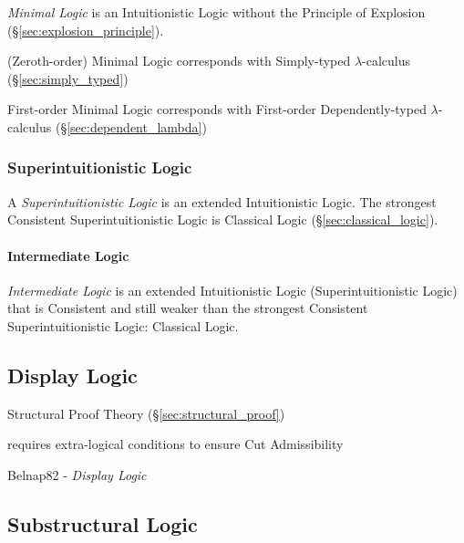 \emph{Minimal Logic} is an Intuitionistic Logic without the Principle
of Explosion (\S\ref{sec:explosion_principle}).

(Zeroth-order) Minimal Logic corresponds with Simply-typed
$\lambda$-calculus (\S\ref{sec:simply_typed})

First-order Minimal Logic corresponds with First-order Dependently-typed
$\lambda$-calculus (\S\ref{sec:dependent_lambda})



\subsubsection{Superintuitionistic Logic}
\label{sec:superintuitionistic_logic}

A \emph{Superintuitionistic Logic} is an extended Intuitionistic
Logic. The strongest Consistent Superintuitionistic Logic is Classical
Logic (\S\ref{sec:classical_logic}).



\paragraph{Intermediate Logic}\label{sec:intermediate_logic}\hfill

\emph{Intermediate Logic} is an extended Intuitionistic Logic
(Superintuitionistic Logic) that is Consistent and still weaker than
the strongest Consistent Superintuitionistic Logic: Classical Logic.



\subsection{Display Logic}\label{sec:display_logic}

\fist Structural Proof Theory (\S\ref{sec:structural_proof})

requires extra-logical conditions to ensure Cut Admissibility

Belnap82 - \emph{Display Logic}



\subsection{Substructural Logic}\label{sec:substructural_logic}

